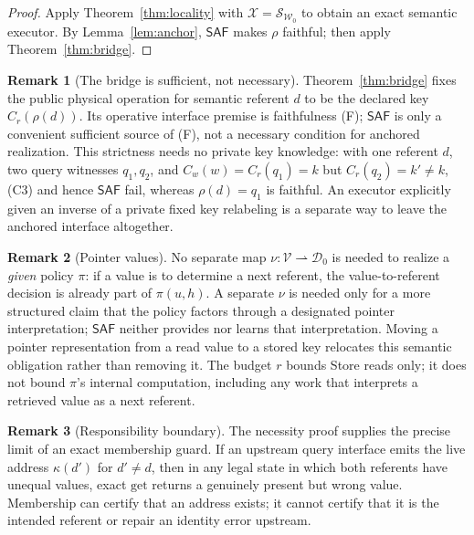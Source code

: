 \documentclass[11pt]{article}
\theoremstyle{definition}
\newtheorem{remark}{Remark}
\theoremstyle{plain}
\newcommand{\Dom}{\mathcal{D}}
\newcommand{\Wr}{\mathcal{W}}
\newcommand{\Va}{\mathcal{V}}
\newcommand{\SAF}{\mathsf{SAF}}
\begin{document}
\begin{proof}
Apply Theorem~\ref{thm:locality} with
\(\mathcal X=\mathcal S_{\Wr_0}\) to obtain an exact semantic executor.
By Lemma~\ref{lem:anchor}, \(\SAF\) makes \(\rho\) faithful; then apply
Theorem~\ref{thm:bridge}.
\end{proof}

\begin{remark}[The bridge is sufficient, not necessary]
Theorem~\ref{thm:bridge} fixes the public physical operation for semantic
referent \(d\) to be the declared key \(C_r(\rho(d))\).  Its operative
interface premise is faithfulness (F); \(\SAF\) is only a convenient
sufficient source of (F), not a necessary condition for anchored
realization.  This strictness needs no private key knowledge: with one
referent \(d\), two query witnesses \(q_1,q_2\), and
\(C_w(w)=C_r(q_1)=k\) but \(C_r(q_2)=k'\neq k\), (C3) and hence \(\SAF\)
fail, whereas \(\rho(d)=q_1\) is faithful.  An executor explicitly given an
inverse of a private fixed key relabeling is a separate way to leave the
anchored interface altogether.
\end{remark}

\begin{remark}[Pointer values]
No separate map \(\nu:\Va\rightharpoonup\Dom_0\) is needed to realize a
\emph{given} policy \(\pi\): if a value is to determine a next referent, the
value-to-referent decision is already part of \(\pi(u,h)\).  A separate
\(\nu\) is needed only for a more structured claim that the policy factors
through a designated pointer interpretation; \(\SAF\) neither provides nor
learns that interpretation.  Moving a pointer representation from a read
value to a stored key relocates this semantic obligation rather than removing
it.  The budget \(r\) bounds Store reads only; it does not bound \(\pi\)'s
internal computation, including any work that interprets a retrieved value
as a next referent.
\end{remark}

\begin{remark}[Responsibility boundary]\label{rem:boundary}
The necessity proof supplies the precise limit of an exact membership guard.
If an upstream query interface emits the live address \(\kappa(d')\) for
\(d'\neq d\), then in any legal state in which both referents have unequal
values, exact \(\mathrm{get}\) returns a genuinely present but wrong value.
Membership can certify that an address exists; it cannot certify that it is
the intended referent or repair an identity error upstream.
\end{remark}
\end{document}

